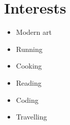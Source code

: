 \section{Interests}

\vspace{3mm}

\noindent
\begin{minipage}{.30\textwidth}
\raggedright
\begin{itemize}
    \item Modern art
    \item Running
\end{itemize}
\end{minipage}%
\hspace{5mm}
\begin{minipage}{.30\textwidth}
\raggedright
\begin{itemize}
    \item Cooking
    \item Reading
\end{itemize}
\end{minipage}
\hspace{5mm}
\begin{minipage}{.30\textwidth}
\raggedright
\begin{itemize}
    \item Coding
    \item Travelling
\end{itemize}
\end{minipage}
